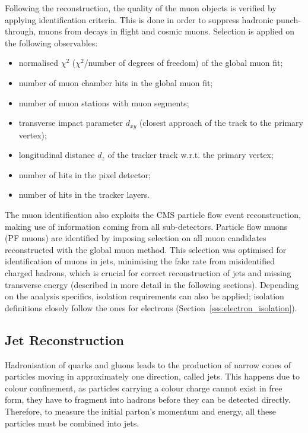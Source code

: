 Following the reconstruction, the quality of the muon objects is verified by applying identification criteria. This is
done in order to suppress hadronic punch-through, muons from decays in flight and cosmic muons. Selection is applied on
the following observables:
\begin{itemize}
  \item normalised $\chi^2$ ($\chi^2$/number of degrees of freedom) of the global muon fit;
  \item number of muon chamber hits in the global muon fit;
  \item number of muon stations with muon segments;
  \item transverse impact parameter $d_{xy}$ (closest approach of the track to the primary vertex);
  \item longitudinal distance $d_z$ of the tracker track w.r.t. the primary vertex;
  \item number of hits in the pixel detector;
  \item number of hits in the tracker layers.
\end{itemize}

The muon identification also exploits the CMS particle flow event reconstruction, making use of information coming from
all sub-detectors. Particle flow muons (PF muons) are identified by imposing selection on all muon candidates
reconstructed with the global muon method. This selection was optimised for identification of muons in jets, minimising
the fake rate from misidentified charged hadrons, which is crucial for correct reconstruction of jets and missing
transverse energy (described in more detail in the following sections). Depending on the analysis specifics, isolation
requirements can also be applied; isolation definitions closely follow the ones for electrons
(Section~\ref{sss:electron_isolation}).

\newpage
\subsection{Jet Reconstruction}
\label{ss:jet_reconstruction}
Hadronisation of quarks and gluons leads to the production of narrow cones of particles moving in approximately one
direction, called jets. This happens due to colour confinement, as particles carrying a colour charge cannot exist in
free form, they have to fragment into hadrons before they can be detected directly. Therefore, to measure the initial
parton's momentum and energy, all these particles must be combined into jets.

